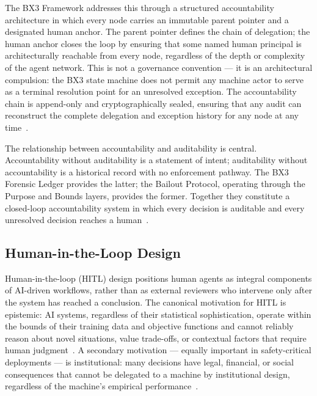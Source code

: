 The BX3 Framework addresses this through a structured accountability architecture in which every node carries an immutable parent pointer and a designated human anchor. The parent pointer defines the chain of delegation; the human anchor closes the loop by ensuring that some named human principal is architecturally reachable from every node, regardless of the depth or complexity of the agent network. This is not a governance convention --- it is an architectural compulsion: the BX3 state machine does not permit any machine actor to serve as a terminal resolution point for an unresolved exception. The accountability chain is append-only and cryptographically sealed, ensuring that any audit can reconstruct the complete delegation and exception history for any node at any time~\cite{wiener1948}.

The relationship between accountability and auditability is central. Accountability without auditability is a statement of intent; auditability without accountability is a historical record with no enforcement pathway. The BX3 Forensic Ledger provides the latter; the Bailout Protocol, operating through the Purpose and Bounds layers, provides the former. Together they constitute a closed-loop accountability system in which every decision is auditable and every unresolved decision reaches a human~\cite{bansal2019}.

\subsection{Human-in-the-Loop Design}
\label{sec:hitl}

Human-in-the-loop (HITL) design positions human agents as integral components of AI-driven workflows, rather than as external reviewers who intervene only after the system has reached a conclusion. The canonical motivation for HITL is epistemic: AI systems, regardless of their statistical sophistication, operate within the bounds of their training data and objective functions and cannot reliably reason about novel situations, value trade-offs, or contextual factors that require human judgment~\cite{tristr81}. A secondary motivation --- equally important in safety-critical deployments --- is institutional: many decisions have legal, financial, or social consequences that cannot be delegated to a machine by institutional design, regardless of the machine's empirical performance~\cite{bansal2019}.

